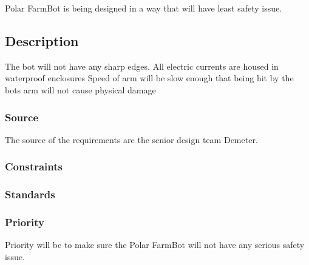 Polar FarmBot is being designed in a way that will have least safety issue.

\subsection{Description}
The bot will not have any sharp edges.
All electric currents are housed in waterproof enclosures
Speed of arm will be slow enough that being hit by the bots arm will not cause physical damage
\subsubsection{Source}
The source of the requirements are the senior design team Demeter.
\subsubsection{Constraints}
\subsubsection{Standards}
\subsubsection{Priority}
Priority will be to make sure the Polar FarmBot will not have any serious safety issue.

